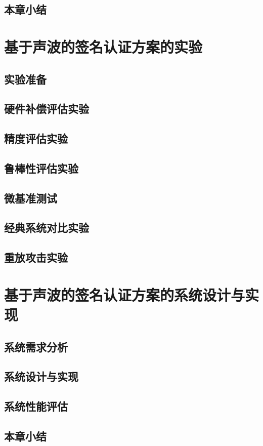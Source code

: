 \section{本章小结}



\chapter{基于声波的签名认证方案的实验}
\section{实验准备}
\section{硬件补偿评估实验}
\section{精度评估实验}
\section{鲁棒性评估实验}
\section{微基准测试}
\section{经典系统对比实验}
\section{重放攻击实验}


\chapter{基于声波的签名认证方案的系统设计与实现}
\section{系统需求分析}
\section{系统设计与实现}
\section{系统性能评估}
\section{本章小结}


